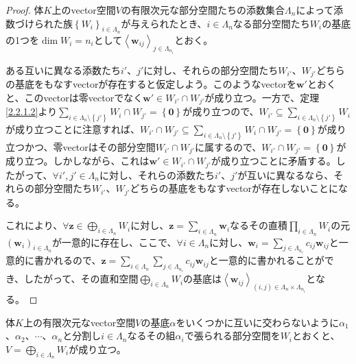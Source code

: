 \documentclass[dvipdfmx]{jsarticle}
\begin{document}
\begin{proof}
体$K$上のvector空間$V$の有限次元な部分空間たちの添数集合$\varLambda_{n}$によって添数づけられた族$\left\{ W_{i} \right\}_{i \in \varLambda_{n}}$が与えられたとき、$i \in \varLambda_{n}$なる部分空間たち$W_{i}$の基底の1つを$\dim W_{i} = n_{i}$として$\left\langle \mathbf{w}_{ij} \right\rangle_{j \in \varLambda_{n_{i}}}$とおく。\par
ある互いに異なる添数たち$i'$、$j'$に対し、それらの部分空間たち$W_{i'}$、$W_{j'}$どちらの基底をもなすvectorが存在すると仮定しよう。このようなvectorを$\mathbf{w}'$とおくと、このvectorは零vectorでなく$\mathbf{w}' \in W_{i'} \cap W_{j'}$が成り立つ。一方で、定理\ref{2.2.1.2}より$\sum_{i \in \varLambda_{n} \setminus \left\{ j' \right\}} W_{i} \cap W_{j'} = \left\{ \mathbf{0} \right\}$が成り立つので、$W_{i'} \subseteq \sum_{i \in \varLambda_{n} \setminus \left\{ j' \right\}} W_{i}$が成り立つことに注意すれば、$W_{i'} \cap W_{j'} \subseteq \sum_{i \in \varLambda_{n} \setminus \left\{ j' \right\}} W_{i} \cap W_{j'} = \left\{ \mathbf{0} \right\}$が成り立つかつ、零vectorはその部分空間$W_{i'} \cap W_{j'}$に属するので、$W_{i'} \cap W_{j'} = \left\{ \mathbf{0} \right\}$が成り立つ。しかしながら、これは$\mathbf{w}' \in W_{i'} \cap W_{j'}$が成り立つことに矛盾する。したがって、$\forall i',j' \in \varLambda_{n}$に対し、それらの添数たち$i'$、$j'$が互いに異なるなら、それらの部分空間たち$W_{i'}$、$W_{j'}$どちらの基底をもなすvectorが存在しないことになる。\par
これにより、$\forall\mathbf{z} \in \bigoplus_{i \in \varLambda_{n}} W_{i}$に対し、$\mathbf{z} = \sum_{i \in \varLambda_{n}} \mathbf{w}_{i}$なるその直積$\prod_{i \in \varLambda_{n}} W_{i}$の元$\left( \mathbf{w}_{i} \right)_{i \in \varLambda_{n}}$が一意的に存在し、ここで、$\forall i \in \varLambda_{n}$に対し、$\mathbf{w}_{i} = \sum_{j \in \varLambda_{n_{i}}} {c_{ij}\mathbf{w}_{ij}}$と一意的に書かれるので、$\mathbf{z} = \sum_{i \in \varLambda_{n}} {\sum_{j \in \varLambda_{n_{i}}} {c_{ij}\mathbf{w}_{ij}}}$と一意的に書かれることができ、したがって、その直和空間$\bigoplus_{i \in \varLambda_{n}} W_{i}$の基底は$\left\langle \mathbf{w}_{ij} \right\rangle_{(i,j) \in \varLambda_{n} \times \varLambda_{n_{i}}}$となる。
\end{proof}
\begin{thm}\label{2.2.1.6}
体$K$上の有限次元なvector空間$V$の基底$\alpha$をいくつかに互いに交わらないように$\alpha_{1}$、$\alpha_{2}$、$\cdots$、$\alpha_{n}$と分割し$i \in \varLambda_{n}$なるその組$\alpha_{i}$で張られる部分空間を$W_{i}$とおくと、$V = \bigoplus_{i \in \varLambda_{n}} W_{i}$が成り立つ。
\end{thm}
\end{document}
